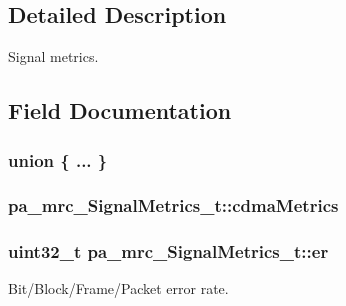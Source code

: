 \subsection{Detailed Description}
Signal metrics. 

\subsection{Field Documentation}
\subsubsection[{\texorpdfstring{"@27}{@27}}]{\setlength{\rightskip}{0pt plus 5cm}union \{ ... \} }\hypertarget{structpa__mrc___signal_metrics__t_a0b82aadbd2158280cc5520ecd012ddee}{}\label{structpa__mrc___signal_metrics__t_a0b82aadbd2158280cc5520ecd012ddee}
\subsubsection[{\texorpdfstring{cdma\+Metrics}{cdmaMetrics}}]{ pa\+\_\+mrc\+\_\+\+Signal\+Metrics\+\_\+t\+::cdma\+Metrics}\hypertarget{structpa__mrc___signal_metrics__t_a4e7f9b94f373e1e62876765e242f73db}{}\label{structpa__mrc___signal_metrics__t_a4e7f9b94f373e1e62876765e242f73db}
\subsubsection[{\texorpdfstring{er}{er}}]{\setlength{\rightskip}{0pt plus 5cm}uint32\+\_\+t pa\+\_\+mrc\+\_\+\+Signal\+Metrics\+\_\+t\+::er}\hypertarget{structpa__mrc___signal_metrics__t_a5bf6e783e4aa649a3aa66f26d716974a}{}\label{structpa__mrc___signal_metrics__t_a5bf6e783e4aa649a3aa66f26d716974a}


Bit/\+Block/\+Frame/\+Packet error rate. 


